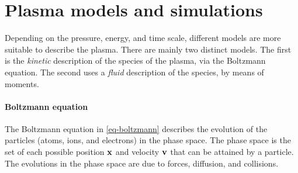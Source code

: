 

\section{Plasma models and simulations}
\label{sec-simulations}

Depending on the pressure, energy, and time scale, different models are more suitable to describe the plasma.
There are mainly two distinct models.
The first is the \emph{kinetic} description of the species of the plasma, via the Boltzmann equation.
The second uses a \emph{fluid} description of the species, by means of moments.
% 


\paragraph{Boltzmann equation \\}
The Boltzmann equation in \cref{eq-boltzmann} describes the evolution of the particles (atoms, ions, and electrons) in the phase space.
The phase space is the set of each possible position ${\mathbf x}$ and velocity ${\mathbf v}$ that can be attained by a particle.
The evolutions in the phase space are due to forces, diffusion, and collisions.

